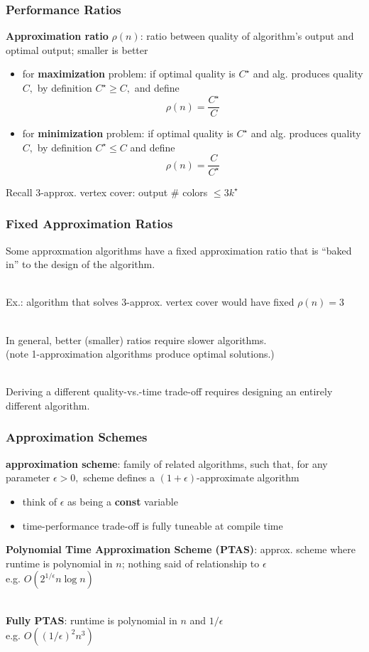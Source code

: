 \documentclass{beamer}
\newcommand{\stanza}{ \\~\ }
\begin{document}
\begin{frame} \frametitle{Performance Ratios}
\textbf{Approximation ratio} $\rho(n)$: ratio between quality of algorithm's output
and optimal output; smaller is better
\begin{itemize}
  \item for \textbf{maximization} problem: if optimal quality is $C^\star$ and alg. produces
    quality $C,$ by definition $C^\star \geq C,$ and define
    \[ \rho(n) = \frac{C^\star}{C} \]
  \item for \textbf{minimization} problem: if optimal quality is $C^\star$ and alg. produces
    quality $C,$ by definition $C^\star \leq C$ and define
    \[ \rho(n) = \frac{C}{C^\star} \]
\end{itemize}
Recall 3-approx. vertex cover: output \# colors $\leq 3 k^\star$
\end{frame}

\begin{frame} \frametitle{Fixed Approximation Ratios}
Some approxmation algorithms have a fixed approximation ratio that is
``baked in'' to the design of the algorithm. \stanza

Ex.: algorithm that solves 3-approx. vertex cover would have fixed $\rho(n)=3$
\stanza

In general, better (smaller) ratios require slower algorithms. \\
(note 1-approximation algorithms produce optimal solutions.) \stanza

Deriving a different quality-vs.-time trade-off requires designing an
entirely different algorithm.
\end{frame}

\begin{frame} \frametitle{Approximation Schemes}
\textbf{approximation scheme}: family of related algorithms, such that, for
any parameter $\epsilon > 0,$ scheme defines a
$(1+\epsilon)$-approximate algorithm
\begin{itemize}
  \item think of $\epsilon$ as being a \textbf{const} variable
  \item time-performance trade-off is fully tuneable at compile time
\end{itemize}

\textbf{Polynomial Time Approximation Scheme (PTAS)}: approx. scheme where runtime
is polynomial in $n$; nothing said of relationship to $\epsilon$ \\
e.g. $O(2^{1/\epsilon} n \log n)$ \stanza

\textbf{Fully PTAS}: runtime is polynomial in $n$ and $1/\epsilon$ \\
e.g. $O((1/\epsilon)^2 n^3)$
\end{frame}
\end{document}
